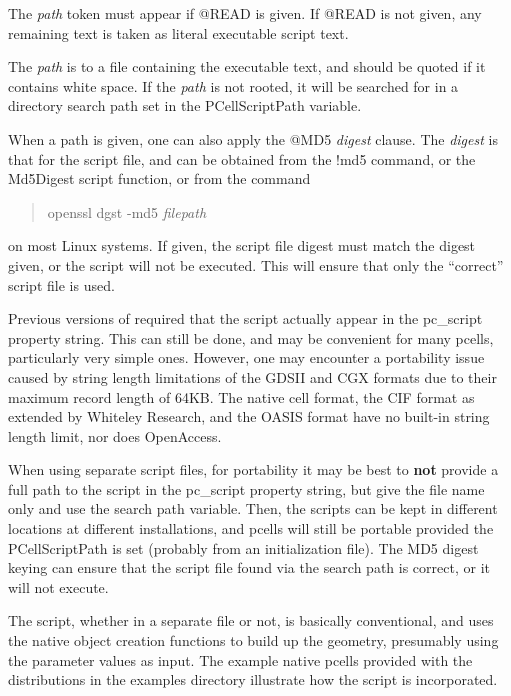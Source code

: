 \begin{description}
The {\it path} token must appear if {\vt @READ} is given.  If {\vt
@READ} is not given, any remaining text is taken as literal executable
script text.

The {\it path} is to a file containing the executable text, and should
be quoted if it contains white space.  If the {\it path} is not
rooted, it will be searched for in a directory search path set in the
{\et PCellScriptPath} variable.

When a path is given, one can also apply the {\vt @MD5} {\it digest}
clause.  The {\it digest} is that for the script file, and can be
obtained from the {\cb !md5} command, or the {\vt Md5Digest} script
function, or from the command
\begin{quote}
{\vt openssl dgst -md5} {\it filepath}
\end{quote}
on most Linux systems.  If given, the script file digest must match
the digest given, or the script will not be executed.  This will
ensure that only the ``correct'' script file is used.
\end{description}

Previous versions of {\Xic} required that the script actually appear
in the {\et pc\_script} property string.  This can still be done, and
may be convenient for many pcells, particularly very simple ones. 
However, one may encounter a portability issue caused by string length
limitations of the GDSII and CGX formats due to their maximum record
length of 64KB.  The native cell format, the CIF format as extended by
Whiteley Research, and the OASIS format have no built-in string length
limit, nor does OpenAccess.

When using separate script files, for portability it may be best to
{\bf not} provide a full path to the script in the {\et pc\_script}
property string, but give the file name only and use the search path
variable.  Then, the scripts can be kept in different locations at
different {\Xic} installations, and pcells will still be portable
provided the {\et PCellScriptPath} is set (probably from an
initialization file).  The {\vt MD5} digest keying can ensure that the
script file found via the search path is correct, or it will not
execute.

The script, whether in a separate file or not, is basically
conventional, and uses the native object creation functions to build
up the geometry, presumably using the parameter values as input.  The
example native pcells provided with the {\Xic} distributions in the
examples directory illustrate how the script is incorporated.

